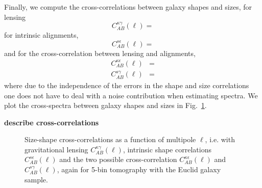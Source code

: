 \documentclass[a4paper,fleqn,usenatbib]{mnras}
\def\spirou#1{{\bf #1}}
\begin{document}
Finally, we compute the cross-correlations between galaxy shapes and sizes, for lensing
\begin{equation}
C_{AB}^{\kappa\gamma}(\ell) = 
\end{equation}
for intrinsic alignments,
\begin{equation}
C_{AB}^{s\epsilon}(\ell) = 
\end{equation}
and for the cross-correlation between lensing and alignments,
\begin{align}
C_{AB}^{\kappa\epsilon}(\ell) & = \\
C_{AB}^{s\gamma}(\ell) & = 
\end{align}
where due to the independence of the errors in the shape and size correlations one does not have to deal with a noise contribution when estimating spectra. We plot the cross-spectra between galaxy shapes and sizes in Fig.~\ref{fig:sizeshape}.

\spirou{describe cross-correlations}


\begin{figure}
\centering
\caption{Size-shape cross-correlations as a function of multipole $\ell$, i.e. with gravitational lensing $C_{AB}^{\kappa\gamma}(\ell)$, intrinsic shape correlations $C_{AB}^{s\epsilon}(\ell)$ and the two possible cross-correlation $C_{AB}^{\kappa\epsilon}(\ell)$ and $C_{AB}^{s\gamma}(\ell)$, again for 5-bin tomography with the Euclid galaxy sample.}
\label{fig:sizeshape}
\end{figure}


\end{document}
